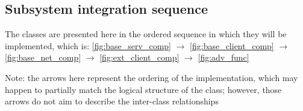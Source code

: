 \subsection{Subsystem integration sequence}
The classes are presented here in the ordered sequence in which they will be implemented, which is:
\ref{fig:base_serv_comp} $\rightarrow$ \ref{fig:base_client_comp} $\rightarrow$ \ref{fig:base_net_comp}
 $\rightarrow$ \ref{fig:ext_client_comp} $\rightarrow$ \ref{fig:adv_func}

Note: the arrows here represent the ordering of the implementation, which may happen to partially
match the logical structure of the class; however, those arrows do not aim to describe the inter-class
relationships

